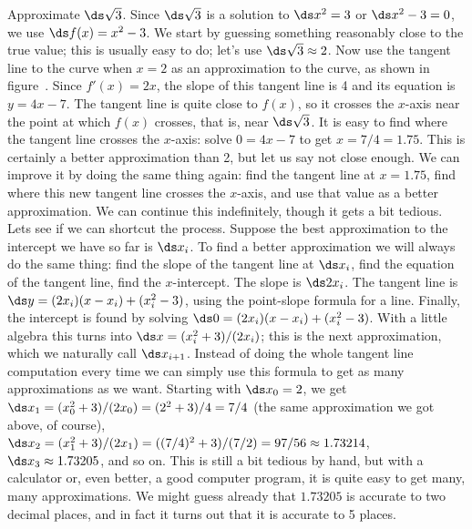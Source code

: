 \begin{example} Approximate $\ds \sqrt{3}$. Since $\ds \sqrt{3}$ is a solution to
$\ds x^2=3$ or $\ds x^2-3=0$, we use $\ds f(x)=x^2-3$. We start by guessing
something reasonably close to the true value; this is usually easy to
do; let's use $\ds \sqrt3\approx2$. Now use the tangent line to the curve
when $x=2$ as an approximation to the curve, as shown in
figure~. Since $f'(x)=2x$, the slope of this
tangent line is 4 and its equation is $y=4x-7$. The tangent line is
quite close to $f(x)$, so it crosses the $x$-axis near the point at
which $f(x)$ crosses, that is, near $\ds \sqrt3$. It is easy to find where
the tangent line crosses the $x$-axis: solve $0=4x-7$ to get
$x=7/4=1.75$. This is certainly a better approximation than 2, but let
us say not close enough. We can improve it by doing the same thing
again: find the tangent line at $x=1.75$, find where this new tangent
line crosses the $x$-axis, and use that value as a better
approximation. We can continue this indefinitely, though it gets a bit
tedious. Lets see if we can shortcut the process. Suppose the best
approximation to the intercept we have so far is $\ds x_i$. To find a
better approximation we will always
do the same thing: find the slope of the tangent line at $\ds x_i$, find the
equation of the tangent line, find the $x$-intercept. The slope is
$\ds 2x_i$. The tangent line is $\ds y=(2x_i)(x-x_i)+(x_i^2-3)$, using
the point-slope formula for a line. Finally, the intercept is found by
solving $\ds 0 =(2x_i)(x-x_i)+(x_i^2-3)$. With a little algebra this turns
into $\ds x=(x_i^2+3)/(2x_i)$; this is the next approximation, which we
naturally call $\ds x_{i+1}$. Instead of doing the whole tangent line
computation every time we can simply use this formula to get as many
approximations as we want. Starting with $\ds x_0=2$, we get
$\ds x_1=(x_0^2+3)/(2x_0)=(2^2+3)/4=7/4$ (the same approximation we got
above, of course), $\ds x_2=(x_1^2+3)/(2x_1)=
((7/4)^2+3)/(7/2)=97/56\approx 1.73214$, $\ds x_3\approx 1.73205$, and so
on. This is still a bit tedious by hand, but with a calculator or,
even better, a good computer program, it is quite easy to get many,
many approximations. We might guess already that $1.73205$ is accurate
to two decimal places, and in fact it turns out that it is accurate to
5 places.  \end{example}


